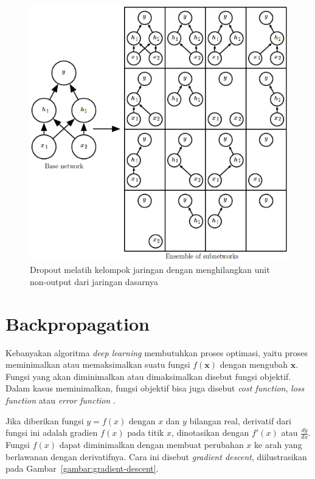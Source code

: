 \begin{figure}[h]
    \centering
    \includegraphics[width=12cm]{gambar/landasan-teori/dropout.png}
    \caption{Dropout melatih kelompok jaringan dengan menghilangkan unit non-output dari jaringan dasarnya \Parencite{Goodfellow-2016}}
    \label{gambar:dropout}
\end{figure}

\section{Backpropagation}
Kebanyakan algoritma \textit{deep learning} membutuhkan proses optimasi, yaitu proses meminimalkan atau memaksimalkan suatu fungsi $f(\pmb{x})$ dengan mengubah $\pmb{x}$. Fungsi yang akan diminimalkan atau dimaksimalkan disebut fungsi objektif. Dalam kasus meminimalkan, fungsi objektif bisa juga disebut \textit{cost function}, \textit{loss function} atau \textit{error function} \Parencite{Goodfellow-2016}.

Jika diberikan fungsi $y = f(x)$ dengan $x$ dan $y$ bilangan real, derivatif dari fungsi ini adalah gradien $f(x)$ pada titik $x$, dinotasikan dengan $f'(x)$ atau $\frac{dy}{dx}$. Fungsi $f(x)$ dapat diminimalkan dengan membuat perubahan $x$ ke arah yang berlawanan dengan derivatifnya. Cara ini disebut \textit{gradient descent}, diilustrasikan pada Gambar~\ref{gambar:gradient-descent}.

